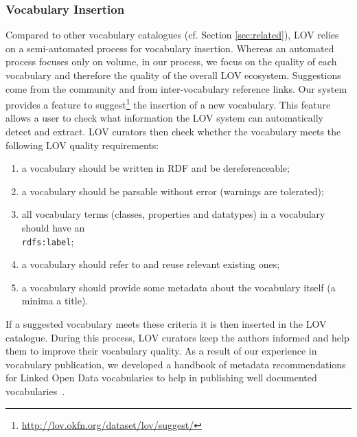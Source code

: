 \documentclass{iosart2c}
\begin{document}

	\subsubsection{Vocabulary Insertion}\label{sssec:vocabInsert} Compared to other vocabulary catalogues (cf. Section \ref{sec:related}), LOV relies on a semi-automated process for vocabulary insertion. Whereas an automated process focuses only on volume, in our process, we focus on the quality of each vocabulary and therefore the quality of the overall LOV ecosystem. Suggestions come from the community and from inter-vocabulary reference links. Our system provides a feature to suggest\footnote{\url{http://lov.okfn.org/dataset/lov/suggest/}} the insertion of a new vocabulary. This feature allows a user to check what information the LOV system can automatically detect and extract. LOV curators then check whether the vocabulary meets the following LOV quality requirements:
\begin{enumerate}
 \item a vocabulary should be written in RDF and be dereferenceable;
 \item a vocabulary should be parsable without error (warnings are tolerated);
 \item all vocabulary terms (classes, properties and datatypes) in a vocabulary should have an \\ {\small\texttt{rdfs:label}};
 \item a vocabulary should refer to and reuse relevant existing ones;
 \item a vocabulary should provide some metadata about the vocabulary itself (a minima a title).
\end{enumerate}
If a suggested vocabulary meets these criteria it is then inserted in the LOV catalogue. During this process, LOV curators keep the authors informed and help them to improve their vocabulary quality. As a result of our experience in vocabulary publication, we developed a handbook of metadata recommendations for Linked Open Data vocabularies to help in publishing well documented vocabularies~\cite{vandenbussche2011metadata}.
\end{document}
